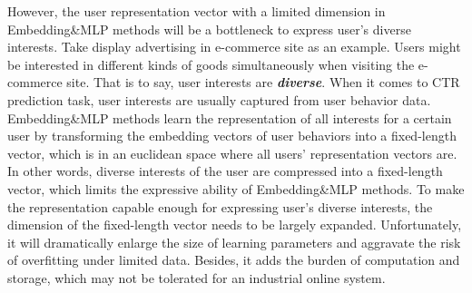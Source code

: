However, the user representation vector with a limited dimension in Embedding\&MLP methods will be a bottleneck to express user's diverse interests. %
Take display advertising in e-commerce site as an example. Users might be interested in different kinds of goods simultaneously when visiting the e-commerce site. That is to say, user interests are \textsl{\textbf{diverse}}. When it comes to CTR prediction task, user interests are usually captured from user behavior data. 
Embedding\&MLP methods learn the  representation of all interests for a certain user by transforming the embedding vectors of user behaviors into a fixed-length vector, which is in an euclidean space where all users' representation vectors are. 
In other words, diverse interests of the user are compressed into a fixed-length vector, which limits the expressive ability of Embedding\&MLP methods. 
To make the representation capable enough for expressing user's diverse interests,  the dimension of the fixed-length vector needs to be largely expanded. 
Unfortunately, it will dramatically enlarge the size of learning parameters and aggravate the risk of overfitting under limited data. Besides, it adds the burden of computation and storage, which may not be tolerated for an industrial online system. 

